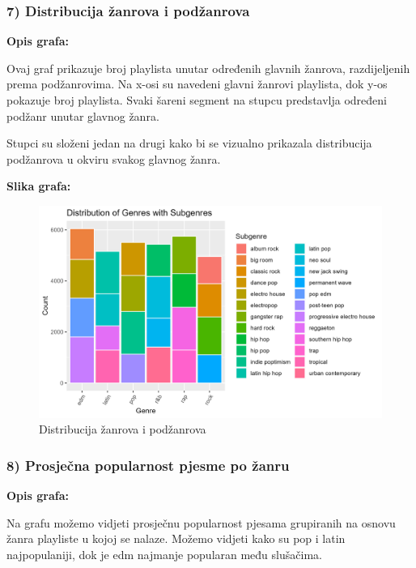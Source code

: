 		\subsubsection{7) Distribucija žanrova i podžanrova}
	
	\textbf{Opis grafa:}
	
		Ovaj graf prikazuje broj playlista unutar određenih glavnih žanrova, razdijeljenih prema podžanrovima. Na x-osi su navedeni glavni žanrovi playlista, dok y-os pokazuje broj playlista. Svaki šareni segment na stupcu predstavlja određeni podžanr unutar glavnog žanra.
		
		Stupci su složeni jedan na drugi kako bi se vizualno prikazala distribucija podžanrova u okviru svakog glavnog žanra. 
	
	
	\textbf{Slika grafa:}
	\begin{figure}[H]
		\includegraphics[scale=0.9]{slike/Genre-Subgenre.png}
		\centering
		\caption{Distribucija žanrova i podžanrova}
		
	\end{figure}
	
	\subsubsection{8)  Prosječna popularnost pjesme po žanru}
	
	\textbf{Opis grafa:}
	
	Na grafu možemo vidjeti prosječnu popularnost pjesama grupiranih na osnovu žanra playliste u kojoj se nalaze. Možemo vidjeti kako su pop i latin najpopulaniji, dok je edm najmanje popularan među slušačima. 
	
